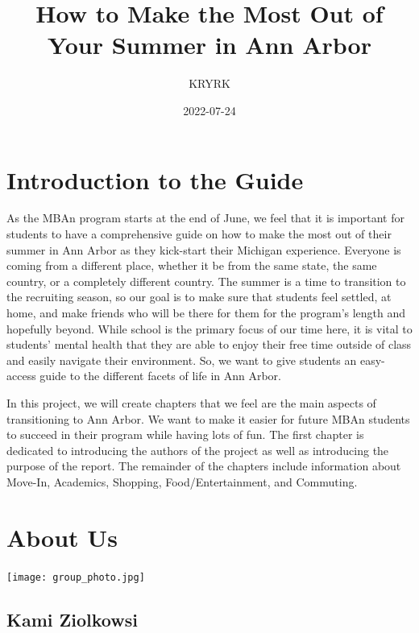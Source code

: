 \documentclass[
]{book}
\title{How to Make the Most Out of Your Summer in Ann Arbor}
\author{KRYRK}
\date{2022-07-24}
\begin{document}
\maketitle

{
\setcounter{tocdepth}{1}
\tableofcontents
}
\hypertarget{introduction-to-the-guide}{%
\chapter*{Introduction to the Guide}\label{introduction-to-the-guide}}

As the MBAn program starts at the end of June, we feel that it is important for students to have a comprehensive guide on how to make the most out of their summer in Ann Arbor as they kick-start their Michigan experience. Everyone is coming from a different place, whether it be from the same state, the same country, or a completely different country. The summer is a time to transition to the recruiting season, so our goal is to make sure that students feel settled, at home, and make friends who will be there for them for the program's length and hopefully beyond. While school is the primary focus of our time here, it is vital to students' mental health that they are able to enjoy their free time outside of class and easily navigate their environment. So, we want to give students an easy-access guide to the different facets of life in Ann Arbor.

In this project, we will create chapters that we feel are the main aspects of transitioning to Ann Arbor. We want to make it easier for future MBAn students to succeed in their program while having lots of fun. The first chapter is dedicated to introducing the authors of the project as well as introducing the purpose of the report. The remainder of the chapters include information about Move-In, Academics, Shopping, Food/Entertainment, and Commuting.

\hypertarget{about-us}{%
\chapter*{About Us}\label{about-us}}

\texttt{[image: group\_photo.jpg]}

\hypertarget{kami-ziolkowsi}{%
\section{Kami Ziolkowsi}\label{kami-ziolkowsi}}
\end{document}
